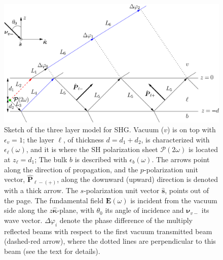 \begin{figure}[t]
\centering 
\includegraphics[scale=.5]{figures/diag-3layer_MR_2w}
\caption{Sketch of the three layer model for SHG. Vacuum ($v$) is on top with $\epsilon_v=1$; the layer $\ell$, of thickness $d=d_1+d_2$, is characterized with $\epsilon_{\ell}(\omega)$, and it is where the SH polarization sheet $\boldsymbol{\mathcal{P}}(2\omega)$ is located at $z_\ell=d_1$; The bulk $b$ is described with $\epsilon_{b}(\omega)$. The arrows point along the direction of propagation, and the $p$-polarization unit vector, $\hat{\mathbf{P}}_{\ell -(+)}$, along the downward (upward) direction is denoted with a thick arrow. The $s$-polarization unit vector $\hat{\mathbf{s}}$, points out of the page. The fundamental field $\mathbf{E}(\omega)$ is incident from the vacuum side along the $z\hat{\boldsymbol{\kappa}}$-plane, with $\theta_{0}$ its angle of incidence and $\boldsymbol{\nu}_{v-}$ its wave vector. $\Delta\varphi_{i}$ denote the phase difference of the multiply reflected beams with respect to the first vacuum transmitted beam (dashed-red arrow), where the dotted lines are perpendicular to this beam (see the text for details).}
\label{fig:MR3layer}
\end{figure}

